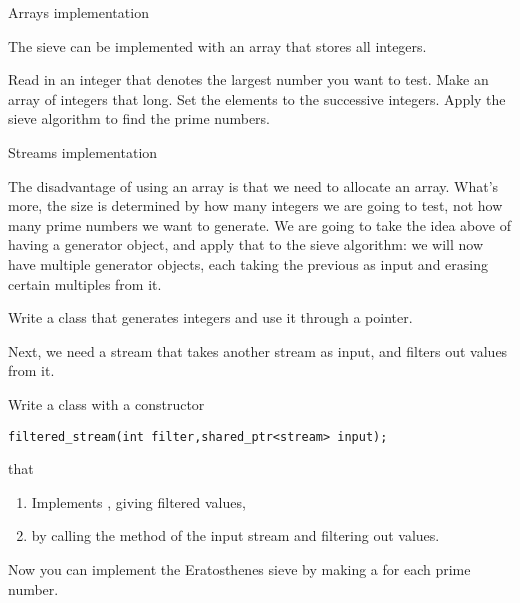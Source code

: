  {Arrays implementation}
\label{sec:arraysieve}

The sieve can be implemented with an array that stores all integers.

\begin{exercise}
  \label{ex:arraysieve}
  Read in an integer that denotes the largest number you want to test.
  Make an array of integers that long. Set the elements to the
  successive integers. Apply the sieve algorithm to find the prime numbers.
\end{exercise}

 {Streams implementation}
\label{sec:streamsieve}

The disadvantage of using an array is that we need to allocate
an array. What's more, the size is determined by how many integers we
are going to test, not how many prime numbers we want to generate.
We are going to take the idea above of having a generator object, and
apply that to the sieve algorithm: we will now have multiple generator
objects, each taking the previous as input and erasing certain
multiples from it.

\begin{exercise}
  Write a  class that generates integers and use it through
  a pointer.
\end{exercise}

Next, we need a stream that takes another stream as input, and filters
out values from it.

\begin{exercise}
  Write a class  with a constructor
\begin{lstlisting}
filtered_stream(int filter,shared_ptr<stream> input);
\end{lstlisting}
  that
  \begin{enumerate}
  \item Implements , giving filtered values,
  \item by calling the  method of the input stream and
    filtering out values.
  \end{enumerate}
\end{exercise}

Now you can implement the Eratosthenes sieve by making a
 for each prime number.

